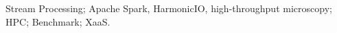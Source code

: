 \documentclass[conference]{IEEEtran}
\begin{document}
\begin{abstract}







\end{abstract}



\begin{IEEEkeywords}Stream Processing; Apache Spark, HarmonicIO, high-throughput microscopy; HPC; Benchmark; XaaS.\end{IEEEkeywords} %
\end{document}
